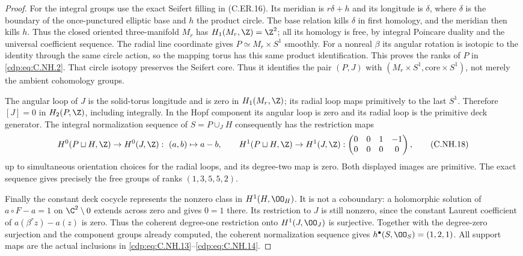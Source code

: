 \begin{proof}
For the integral groups use the exact Seifert filling in
(C.ER.16). Its meridian is $r\delta+h$ and its longitude
is $\delta$, where $\delta$ is the boundary of the
once-punctured elliptic base and $h$ the product circle.
The base relation kills $\delta$ in first homology, and
the meridian then kills $h$. Thus the closed oriented
three-manifold $M_r$ has $H_1(M_r,\Z)=\Z^2$; all its
homology is free, by integral Poincare duality and the
universal coefficient sequence. The radial line coordinate
gives $P\simeq M_r\times S^1$ smoothly. For a nonreal
$\beta$ its angular rotation is isotopic to the identity
through the same circle action, so the mapping torus has
this same product identification. This proves the ranks
of $P$ in \eqref{cdp:eq:C.NH.2}.
That circle isotopy preserves the Seifert core. Thus it
identifies the pair $(P,J)$ with
$(M_r\times S^1,\mathrm{core}\times S^1)$, not merely
the ambient cohomology groups.

The angular loop of $J$ is the solid-torus longitude and
is zero in $H_1(M_r,\Z)$; its radial loop maps primitively
to the last $S^1$. Therefore $[J]=0$ in $H_2(P,\Z)$,
including integrally. In the Hopf component its angular
loop is zero and its radial loop is the primitive deck
generator. The integral normalization sequence of
$S=P\cup_JH$ consequently has the restriction maps
\[
 H^0(P\sqcup H,\Z)\to H^0(J,\Z):\ (a,b)\mapsto a-b,
 \qquad
 H^1(P\sqcup H,\Z)\to H^1(J,\Z):
 \begin{pmatrix}0&0&1&-1\\0&0&0&0\end{pmatrix},
                                                        \tag{C.NH.18}\label{cdp:eq:C.NH.18}
\]
up to simultaneous orientation choices for the radial
loops, and its degree-two map is zero. Both displayed
images are primitive. The exact sequence gives precisely
the free groups of ranks $(1,3,5,5,2)$.

Finally the constant deck cocycle represents the nonzero
class in $H^1(H,\OO_H)$. It is not a coboundary: a
holomorphic solution of $a\circ F-a=1$ on $\C^2\setminus0$
extends across zero and gives $0=1$ there. Its restriction
to $J$ is still nonzero, since the constant Laurent
coefficient of $a(\beta^r z)-a(z)$ is zero. Thus the
coherent degree-one restriction onto $H^1(J,\OO_J)$
is surjective. Together with the degree-zero surjection
and the component groups already computed, the coherent
normalization sequence gives $h^\bullet(S,\OO_S)=(1,2,1)$.
All support maps are the actual inclusions in \eqref{cdp:eq:C.NH.13}--\eqref{cdp:eq:C.NH.14}.
\end{proof}


